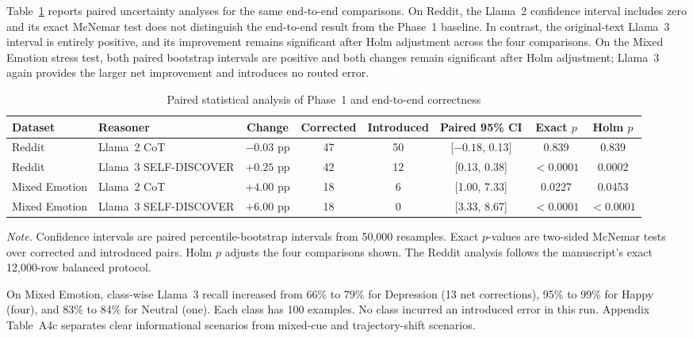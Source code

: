 \documentclass{ieeeaccess}
\begin{document}
Table~\ref{tab:paired-statistics} reports paired uncertainty analyses for the same end-to-end comparisons. On Reddit, the Llama~2 confidence interval includes zero and its exact McNemar test does not distinguish the end-to-end result from the Phase~1 baseline. In contrast, the original-text Llama~3 interval is entirely positive, and its improvement remains significant after Holm adjustment across the four comparisons. On the Mixed Emotion stress test, both paired bootstrap intervals are positive and both changes remain significant after Holm adjustment; Llama~3 again provides the larger net improvement and introduces no routed error.

\begin{table}[t]
\centering
\caption{Paired statistical analysis of Phase~1 and end-to-end correctness}
\label{tab:paired-statistics}
\footnotesize
\setlength{\tabcolsep}{3pt}
\renewcommand{\arraystretch}{1.16}
\begin{tabularx}{\textwidth}{@{}l >{\raggedright\arraybackslash}X c c c c c c@{}}
\toprule
Dataset & Reasoner & Change & Corrected & Introduced & Paired 95\% CI & Exact $p$ & Holm $p$ \\
\midrule
Reddit & Llama~2 CoT & $-0.03$ pp & 47 & 50 & [$-0.18$, 0.13] & 0.839 & 0.839 \\
Reddit & Llama~3 SELF-DISCOVER & $+0.25$ pp & 42 & 12 & [0.13, 0.38] & $<0.0001$ & 0.0002 \\
Mixed Emotion & Llama~2 CoT & $+4.00$ pp & 18 & 6 & [1.00, 7.33] & 0.0227 & 0.0453 \\
Mixed Emotion & Llama~3 SELF-DISCOVER & $+6.00$ pp & 18 & 0 & [3.33, 8.67] & $<0.0001$ & $<0.0001$ \\
\bottomrule
\end{tabularx}
\vspace{2pt}
\parbox{\textwidth}{\footnotesize \textit{Note.} Confidence intervals are paired percentile-bootstrap intervals from 50,000 resamples. Exact $p$-values are two-sided McNemar tests over corrected and introduced pairs. Holm $p$ adjusts the four comparisons shown. The Reddit analysis follows the manuscript's exact 12,000-row balanced protocol.}
\end{table}

On Mixed Emotion, class-wise Llama~3 recall increased from 66\% to 79\% for Depression (13 net corrections), 95\% to 99\% for Happy (four), and 83\% to 84\% for Neutral (one). Each class has 100 examples. No class incurred an introduced error in this run. Appendix Table~A4c separates clear informational scenarios from mixed-cue and trajectory-shift scenarios.
\end{document}
